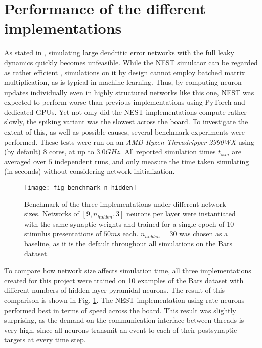 \section{Performance of the different implementations}\label{sec-benchmark}

As stated in \citep{Haider2021}, simulating large dendritic error networks with the full leaky dynamics quickly becomes
unfeasible. While the NEST simulator can be regarded as rather efficient \citep{albada2018performance}, simulations on
it by design cannot employ batched matrix multiplication, as is typical in machine learning. Thus, by computing neuron
updates individually even in highly structured networks like this one, NEST was expected to perform worse than previous
implementations using PyTorch and dedicated GPUs. Yet not only did the NEST implementations compute rather slowly, the
spiking variant was the slowest across the board. To investigate the extent of this, as well as possible causes, several
benchmark experiments were performed. These tests were run on an \textit{AMD Ryzen Threadripper 2990WX} using (by
default) 8 cores, at up to $3.0GHz$. All reported simulation times $t_{sim}$ are averaged over $5$ independent runs, and
only measure the time taken simulating (in seconds) without considering network initialization.


\begin{figure}[h]
    \centering
    \texttt{[image: fig\_benchmark\_n\_hidden]}
    \caption[Benchmark of the three implementations under different network sizes]{Benchmark of the three
        implementations under different network sizes. Networks of $[9, n_{hidden}, 3]$ neurons per layer  were
        instantiated with the same synaptic weights and trained for a single epoch of 10 stimulus presentations of
        $50ms$ each. $n_{hidden}=30$ was chosen as a baseline, as it is the default throughout all simulations on the
        Bars dataset.}
    \label{fig-benchmark-n-hidden}
\end{figure}


To compare how network size affects simulation time, all three implementations created for this project were trained on
10 examples of the Bars dataset with different numbers of hidden layer pyramidal neurons. The result of this comparison
is shown in Fig. \ref{fig-benchmark-n-hidden}.  The NEST implementation using rate neurons performed best in terms of
speed across the board. This result was slightly surprising, as the demand on the communication interface between
threads is very high, since all neurons transmit an event to each of their postsynaptic targets at every time step.

